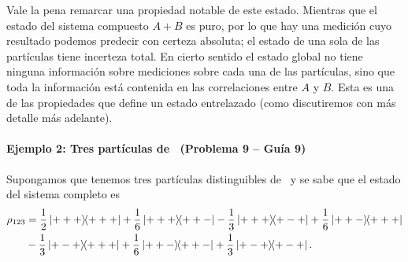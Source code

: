 \documentclass[10pt, a4paper]{article}
\numberwithin{equation}{subsection}
\begin{document}
Vale la pena remarcar una propiedad notable de este estado. Mientras que el
estado del sistema compuesto $A+B$ es puro, por lo que hay una medición cuyo
resultado podemos predecir con certeza absoluta; el estado de una sola de las
partículas tiene incerteza total. En cierto sentido el estado global no tiene
ninguna información sobre mediciones sobre cada una de las partículas, sino que
toda la información está contenida en las correlaciones entre $A$ y $B$. Esta
es una de las propiedades que define un estado entrelazado (como discutiremos
con más detalle más adelante).

\bigbreak

\paragraph{Ejemplo 2: Tres partículas de \spinhalf~(Problema 9 -- Guía 9)}
Supongamos que tenemos tres partículas distinguibles de \spinhalf~y se sabe que
el estado del sistema completo es
\begin{align}
  \rho_{123}
  &= \frac{1}{2}\ketbra{+++}{+++} + \frac{1}{6}\ketbra{+++}{++-} -
    \frac{1}{3}\ketbra{+++}{+-+} + \frac{1}{6}\ketbra{++-}{+++}
    \nonumber \\
  &- \frac{1}{3}\ketbra{+-+}{+++} + \frac{1}{6}\ketbra{++-}{++-} +
    \frac{1}{3}\ketbra{+-+}{+-+}.
\end{align}
\end{document}
